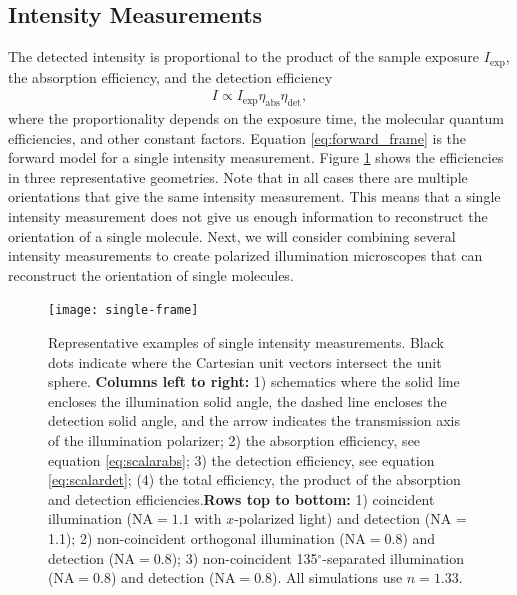 \documentclass[10pt]{article}
\begin{document}
\subsection{Intensity Measurements}\label{forward}
The detected intensity is proportional to the product of the sample exposure
$I_{\text{exp}}$, the absorption efficiency, and the detection efficiency
\begin{align}
  I \propto I_{\text{exp}}\eta_{\text{abs}}\eta_{\text{det}}\label{eq:forward_frame},
\end{align}
where the proportionality depends on the exposure time, the molecular quantum
efficiencies, and other constant factors. Equation \ref{eq:forward_frame} is the
forward model for a single intensity measurement. Figure \ref{fig:single-frame}
shows the efficiencies in three representative geometries. Note that in all
cases there are multiple orientations that give the same intensity
measurement. This means that a single intensity measurement does not give us
enough information to reconstruct the orientation of a single molecule. Next, we
will consider combining several intensity measurements to create polarized
illumination microscopes that can reconstruct the orientation of single
molecules.

\begin{figure}[H]
\centering\texttt{[image: single-frame]}
\caption{Representative examples of single intensity measurements. Black dots
  indicate where the Cartesian unit vectors intersect the unit sphere. \newline \newline \textbf{Columns left to right:} 1) schematics where
  the solid line encloses the illumination solid angle, the dashed line encloses
  the detection solid angle, and the arrow indicates the transmission axis of
  the illumination polarizer; 2) the absorption efficiency, see equation
  \ref{eq:scalarabs}; 3) the detection efficiency, see equation
  \ref{eq:scalardet}; (4) the total efficiency, the product of the absorption
  and detection efficiencies.\newline \newline \textbf{Rows top to bottom:} 1)
  coincident illumination ($\text{NA} = 1.1$ with $x$-polarized light) and
  detection (NA = 1.1); 2) non-coincident orthogonal illumination
  ($\text{NA} = 0.8$) and detection ($\text{NA} = 0.8$); 3) non-coincident
  135${}^{\circ}$-separated illumination ($\text{NA} = 0.8$) and detection
  ($\text{NA} = 0.8$). All simulations use $n=1.33$.}
  \label{fig:single-frame}
\end{figure}
\end{document}
